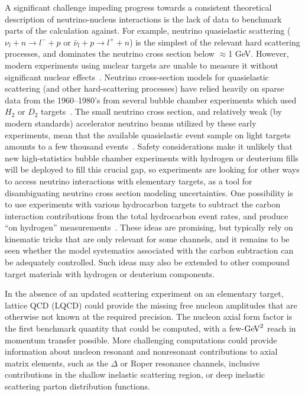 A significant challenge impeding progress towards a consistent theoretical description of neutrino-nucleus interactions is the lack of data to benchmark parts of the calculation against. For example, neutrino quasielastic scattering ($\nu_{l} + n \rightarrow l^{-} + p$ or $\bar{\nu}_{l} + p \rightarrow l^{+} + n$) is the simplest of the relevant hard scattering processes, and dominates the neutrino cross section below $\approx$1 GeV. However, modern experiments using nuclear targets are unable to measure it without significant nuclear effects~\cite{garvey_review_2014, NuSTEC:2017hzk}.
Neutrino cross-section models for quasielastic scattering (and other hard-scattering processes) have relied heavily on sparse data from the 1960--1980's from several bubble chamber experiments which used $H_{2}$ or $D_2$ targets~\cite{zeller12, ParticleDataGroup:2020ssz}.
The small neutrino cross section, and relatively weak (by modern standards) accelerator neutrino beams utilized by these early experiments, mean that the available quasielastic event sample on light targets amounts to a few thousand events~\cite{ANL_Barish_1977, BNL_Baker_1981}.
Safety considerations make it unlikely that new high-statistics bubble chamber experiments with
 hydrogen or deuterium fills will be deployed to fill this crucial gap,
 so experiments are looking for other ways to access neutrino interactions
 with elementary targets, as a tool for disambiguating neutrino cross section modeling uncertainties.
One possibility is to use experiments with various hydrocarbon targets to subtract the carbon interaction contributions from
 the total hydrocarbon event rates, and produce ``on hydrogen'' measurements~\cite{PhysRevD.92.051302, PhysRevD.101.092003, Hamacher-Baumann:2020ogq, DUNE:2021tad}.
 These ideas are promising, but typically rely on kinematic tricks that are only relevant for some channels, and it remains to be seen whether the model systematics associated with the carbon subtraction can be adequately controlled. Such ideas may also be extended to other compound target materials with hydrogen or deuterium components.

In the absence of an updated scattering experiment on an elementary target,
 lattice QCD (LQCD) could provide the missing free nucleon amplitudes
 that are otherwise not known at the required precision.
The nucleon axial form factor is the first benchmark quantity that could be computed,
 with a few-${\rm GeV}^2$ reach in momentum transfer possible.
More challenging computations could provide information about nucleon
 resonant and nonresonant contributions to axial matrix elements,
 such as the $\Delta$ or Roper resonance channels,
 inclusive contributions in the shallow inelastic scattering region,
 or deep inelastic scattering parton distribution functions.

